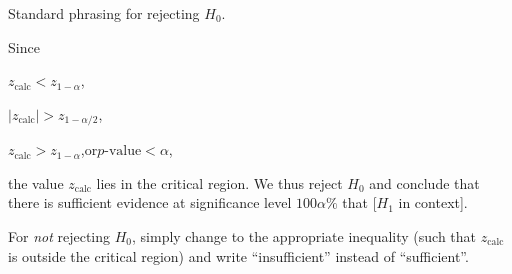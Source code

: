 \documentclass[../Notes.tex]{subfiles}
\begin{document}
\begin{note}
  Standard phrasing for rejecting \(H_0\).
  \begin{center}
    \parbox{0.9\textwidth}{
      Since\quad
      \begin{enumerate*}[label=(\alph*),itemjoin={\quad}]
        \item \(z_\text{calc}<z_{1-\alpha}\),
        \item \(\lvert z_\text{calc} \rvert>z_{1-\alpha/2}\),
        \item \(z_\text{calc}>z_{1-\alpha}\),\quad or\quad \(p\text{-value}<\alpha\),
      \end{enumerate*}
      the value \(z_\text{calc}\) lies in the critical region. We thus reject \(H_0\) and conclude that there is sufficient evidence at significance level \(100\alpha\%\) that [\(H_1\) in context].}
  \end{center}
  For \emph{not} rejecting \(H_0\), simply change to the appropriate inequality (such that \(z_\text{calc}\) is outside the critical region) and write ``insufficient'' instead of ``sufficient''.
\end{note}
\end{document}
